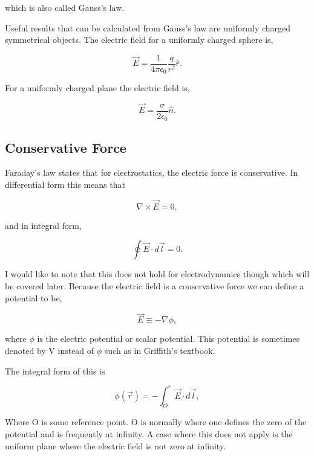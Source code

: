 \documentclass[preprint, review,12pt]{elsarticle}
\def\x{\times}
\def\.{\cdot}
\begin{document}
which is also called Gauss's law. 

Useful results that can be calculated from Gauss's law are uniformly charged symmetrical objects. The electric field for a uniformly charged sphere is,

\begin{equation}
    \vec{E}= \frac{1}{4 \pi \epsilon_0} \frac{q}{r^2}\hat{r}.
\end{equation}

For a uniformly charged plane the electric field is,

\begin{equation}
    \vec{E} = \frac{\sigma}{2\epsilon_0}\hat{n}.
\end{equation}

\subsection{Conservative Force}

Faraday's law states that for electrostatics, the electric force is conservative. In differential form this means that

\begin{equation}
    \nabla \x \vec{E} = 0,
\end{equation}

and in integral form,

\begin{equation}
    \oint \vec{E} \. d\vec{l} = 0.
\end{equation}

I would like to note that this does not hold for electrodynamics though which will be covered later. Because the electric field is a conservative force we can define a potential to be,

\begin{equation}
    \vec{E} \equiv -\nabla \phi,
\end{equation}

where $\phi$ is the electric potential or scalar potential. This potential is sometimes denoted by V instead of $\phi$ such as in Griffith's textbook.

The integral form of this is

\begin{equation}
    \phi(\vec{r}) = - \int_O^r \vec{E}\. d\vec{l},
\end{equation}

Where O is some reference point. O is normally where one defines the zero of the potential and is frequently at infinity. A case where this does not apply is the uniform plane where the electric field is not zero at infinity. 
\end{document}
